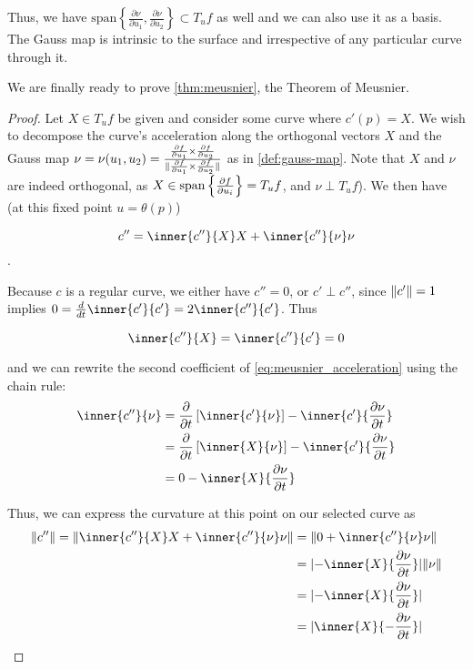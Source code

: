 	Thus, we have $\textrm{span}\left\{ \frac{\partial \nu}{\partial u_1}, \frac{\partial \nu}{\partial u_2}\right\} \subset T_u f$ as well and we can also use it as a basis.
  The Gauss map is intrinsic to the surface and irrespective of any particular curve through it.
	
	We are finally ready to prove \cref{thm:meusnier}, the Theorem of Meusnier.
	
	\begin{proof}
	Let $X\in T_u f$ be given and consider some curve where
  $c'(p) = X$.
  We wish to decompose the curve's acceleration along the  orthogonal vectors $X$ and
	the Gauss map $\nu = \nu(u_1, u_2) =
		\frac{\frac{\partial f}{\partial u_1} \times \frac{\partial f}{\partial u_2}}
		{\Vert\frac{\partial f}{\partial u_1} \times \frac{\partial f}{\partial u_2}\Vert}$ as in \cref{def:gauss-map}.
		Note that $X$ and $\nu$ are indeed orthogonal,
		as $ X \in \mathrm{span}\left\{\frac{\partial f}{\partial u_i}\right\} = T_u f$, and
		$\nu \perp T_u f$).
	 We then have (at this fixed point $u=\theta(p)$)
		
		\begin{equation} \label{eq:meusnier_acceleration}
			c'' = \inner{c''}{X} X + \inner{c''}{\nu}\nu
			\end{equation}. 
	
	Because $c$ is a regular curve, we either have $c''=0$,
	or $c' \perp c''$, since $\Vert c'\Vert = 1$ implies
	$0 = \frac{d}{dt} \inner{c'}{c'} = 2 \inner{c''}{c'} $. Thus
	
		\[ \inner{c''}{X} = \inner{c''}{c'} = 0 \]

	
	 and we can rewrite the second coefficient of \cref{eq:meusnier_acceleration} using the chain rule: %
	\begin{gather}
  \begin{aligned}
		\inner{c''}{\nu} &=
		\frac{\partial}{\partial t}\left[ \inner{c'}{\nu} \right]
			- \inner{c'}{\frac{\partial \nu}{\partial t}} \\
			&= \frac{\partial}{\partial t}\left[ \inner{X}{\nu} \right]
			- \inner{c'}{\frac{\partial \nu}{\partial t}} \\
			&= 0 - \inner{X}{\frac{\partial \nu}{\partial t}}
      \end{aligned}
			\end{gather}
	
	Thus, we can express the curvature at this point on our selected curve as
	\begin{align}
	\vnorm{c''} = \vnorm{\inner{c''}{X} X + \inner{c''}{\nu}\nu}
	&= \vnorm{0 + \inner{c''}{\nu}\nu}  \nonumber \\
	&= \abs{- \inner{X}{\frac{\partial \nu}{\partial t}}}\vnorm{\nu}  \nonumber \\
	&= \abs{- \inner{X}{\frac{\partial \nu}{\partial t}}}  \nonumber \\
	&=  \abs{\inner{X}{-\frac{\partial \nu}{\partial t}}} \label{eq:expand_accel_norm}
	\end{align}
	

\end{proof}
